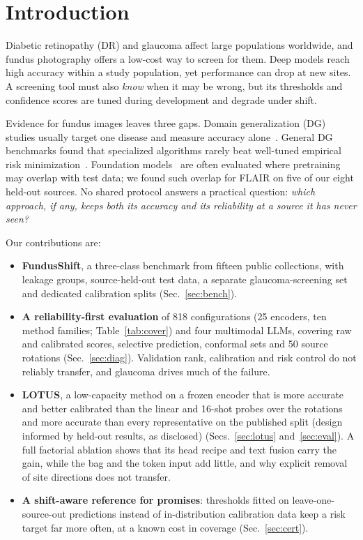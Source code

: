 \documentclass[runningheads]{llncs}
\begin{document}
\section{Introduction}
Diabetic retinopathy (DR) and glaucoma affect large populations worldwide, and fundus photography offers a low-cost way to screen for them. Deep models reach high accuracy within a study population, yet performance can drop at new sites. A screening tool must also \emph{know} when it may be wrong, but its thresholds and confidence scores are tuned during development and degrade under shift.

Evidence for fundus images leaves three gaps. Domain generalization (DG) studies usually target one disease and measure accuracy alone~\cite{drgen,gdrnet}. General DG benchmarks found that specialized algorithms rarely beat well-tuned empirical risk minimization~\cite{domainbed,wilds}. Foundation models~\cite{retfound,flair,medgemma} are often evaluated where pretraining may overlap with test data; we found such overlap for FLAIR on five of our eight held-out sources. No shared protocol answers a practical question: \emph{which approach, if any, keeps both its accuracy and its reliability at a source it has never seen?}

Our contributions are:
\begin{itemize}
\item \textbf{FundusShift}, a three-class benchmark from fifteen public collections, with leakage groups, source-held-out test data, a separate glaucoma-screening set and dedicated calibration splits (Sec.~\ref{sec:bench}).
\item \textbf{A reliability-first evaluation} of 818 configurations (25 encoders, ten method families; Table~\ref{tab:cover}) and four multimodal LLMs, covering raw and calibrated scores, selective prediction, conformal sets and 50 source rotations (Sec.~\ref{sec:diag}). Validation rank, calibration and risk control do not reliably transfer, and glaucoma drives much of the failure.
\item \textbf{LOTUS}, a low-capacity method on a frozen encoder that is more accurate and better calibrated than the linear and 16-shot probes over the rotations and more accurate than every representative on the published split (design informed by held-out results, as disclosed) (Secs.~\ref{sec:lotus} and~\ref{sec:eval}). A full factorial ablation shows that its head recipe and text fusion carry the gain, while the bag and the token input add little, and why explicit removal of site directions does not transfer.
\item \textbf{A shift-aware reference for promises}: thresholds fitted on leave-one-source-out predictions instead of in-distribution calibration data keep a risk target far more often, at a known cost in coverage (Sec.~\ref{sec:cert}).
\end{itemize}
\end{document}
